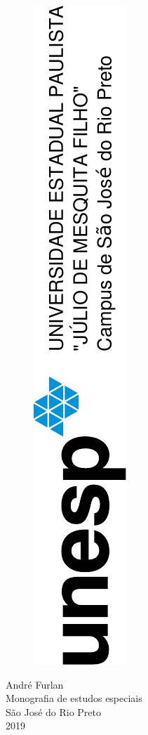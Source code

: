\documentclass[a4paper,12pt,openright,oneside]{book}
\begin{document}
	\thispagestyle{empty}
	\begin{center}
		\par \null
		\begin{figure}[H]
			\centering \includegraphics[angle=-90]{unesp.pdf}
		\end{figure} 
		\vspace{3cm}
		\fontsize{14}{\baselineskip} \selectfont
		{André Furlan} \\  
		\vspace{4.5cm}
		\onehalfspacing
		\fontsize{14}{\baselineskip} \selectfont
		Monografia de estudos especiais \\
		\vspace{7cm}
		\fontsize{14}{\baselineskip} \selectfont  
		{São José do Rio Preto}\\ \vspace{1.0pt} 
		{2019} 
	\end{center}
\end{document}
